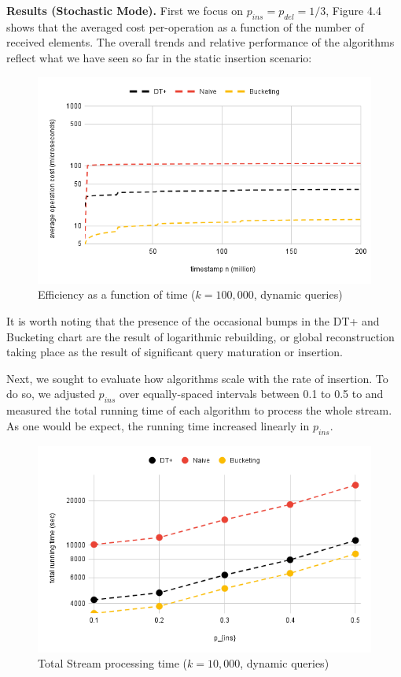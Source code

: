 \textbf{Results (Stochastic Mode).} First we focus on $p_{ins} = p_{del} = 1/3$, Figure 4.4 shows that the averaged cost per-operation as a function of the number of received elements. The overall trends and relative performance of the algorithms reflect what we have seen so far in the static insertion scenario: 

\begin{center}
\begin{figure}[h]
\centering
\includegraphics[scale=0.45]{thesis/figures/chart4.1.png}
\caption{Efficiency as a function of time  ($k=100,000$, dynamic queries)}
\end{figure}
\end{center}

It is worth noting that the presence of the occasional bumps in the DT+ and Bucketing chart are the result of logarithmic rebuilding, or global reconstruction taking place as the result of significant query maturation or insertion.

Next, we sought to evaluate how algorithms scale with the rate of insertion. To do so, we adjusted $p_{ins}$ over equally-spaced intervals between 0.1 to 0.5 to and measured the total running time of each algorithm to process the whole stream. As one would be expect, the running time increased linearly in $p_{ins}$.

\begin{center}
\begin{figure}[h]
\centering
\includegraphics[scale=0.45]{thesis/figures/chart5.1.png}
\caption{Total Stream processing time ($k=10,000$, dynamic queries)}
\end{figure}
\end{center}


